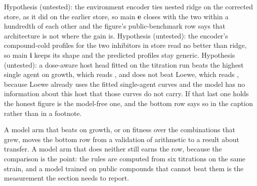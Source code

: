  Hypothesis (untested): the environment encoder ties
nested ridge on the corrected store, as it did on the earlier store, so main \textbf{e}
closes with the two within a hundredth of each other and the figure's public-benchmark
row says that architecture is not where the gain is. Hypothesis (untested): the encoder's
compound-cold profiles for the two inhibitors in store read no better than ridge, so main
\textbf{i} keeps its shape and the predicted profiles stay generic. Hypothesis
(untested): a dose-aware host head fitted on the titration run beats the highest single
agent on growth, which reads \hydhsaAuroc{}, and does not beat Loewe, which reads
\hydloeweAuroc{}, because Loewe already uses the fitted single-agent curves and the model
has no information about this host that those curves do not carry. If that last one holds
the honest figure is the model-free one, and the bottom row says so in the caption rather
than in a footnote.

 A model arm that beats
\hydloeweAuroc{} on growth, or \hydblissSpearman{} on fitness over the combinations that
grew, moves the bottom row from a validation of arithmetic to a result about transfer. A
model arm that does neither still earns the row, because the comparison is the point: the
rules are computed from six titrations on the same strain, and a model trained on
\hydnPoolCompounds{} public compounds that cannot beat them is the measurement the
section needs to report.
